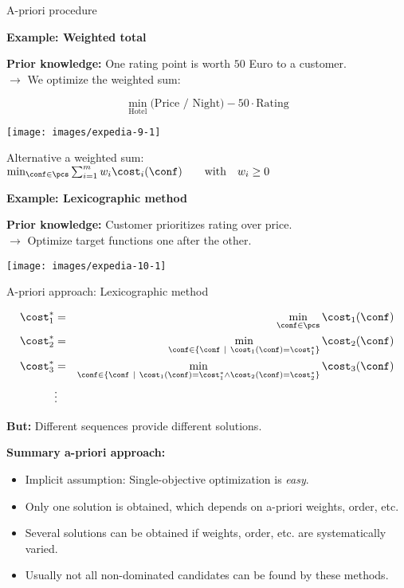\begin{frame}[allowframebreaks]{A-priori procedure}

\textbf{Example: Weighted total}


\textbf{Prior knowledge:} One rating point is worth $50$ Euro to a customer. \\
    $\to$ We optimize the weighted sum:

$$
\min_\text{Hotel} \text{(Price / Night)} - 50 \cdot \text{Rating}
$$

    \begin{center}
\texttt{[image: images/expedia-9-1]}
    \end{center}

Alternative a weighted sum: $\min_{\conf \in \pcs} \sum_{i = 1}^m w_i \cost_i(\conf) \qquad \text{with} \quad w_i \ge 0 $

\framebreak

\textbf{Example: Lexicographic method}

\textbf{Prior knowledge:} Customer prioritizes rating over price. \\
$\to$ Optimize target functions one after the other.


    \begin{center}
\texttt{[image: images/expedia-10-1]}
    \end{center}

\framebreak

A-priori approach: Lexicographic method

\begin{eqnarray*}
\yy_1^* &=& \min_{\conf \in \pcs} \cost_1(\conf)\\
\yy_2^* &=& \min_{\conf \in \{\conf ~|~ \cost_1(\conf) = \yy_1^*\}} \cost_2(\conf) \\
\yy_3^* &=& \min_{\conf \in \{\conf ~|~ \cost_1(\conf) = \yy_1^* \land \cost_2(\conf) = \yy_2^*\}} \cost_3(\conf) \\
&\vdots&
\end{eqnarray*}

    \textbf{But:} Different sequences provide different solutions.

\framebreak

\textbf{Summary a-priori approach:}
\begin{itemize}
\item Implicit assumption: Single-objective optimization is \emph{easy}.
\item Only one solution is obtained, which depends on a-priori weights, order, etc.
\item Several solutions can be obtained if weights, order, etc. are systematically varied.
\item Usually not all non-dominated candidates can be found by these methods.
\end{itemize}

\end{frame}

